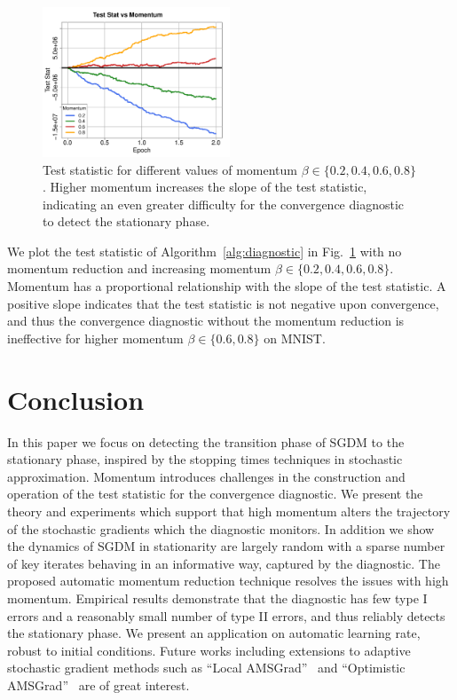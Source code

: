 \documentclass[conference]{IEEEtran}
\begin{document}
\begin{figure}[b]
\vspace{-0.2in}
\begin{center}
\includegraphics[width=2.2in]{fig/RFig8_IPMom.pdf}
\end{center}
\vspace{-0.15in}
  \caption{
  Test statistic for different values of momentum $\beta \in \{0.2, 0.4, 0.6, 0.8\}$. 
  Higher momentum increases the slope of the test statistic, indicating an even greater difficulty for the convergence diagnostic to detect the stationary phase.
  }
\label{fig:mnist_ablation2}\vspace{-0.1in}
\end{figure}


We plot the test statistic of Algorithm~\ref{alg:diagnostic} in Fig.~\ref{fig:mnist_ablation2} with no momentum reduction and increasing momentum $\beta \in \{0.2, 0.4, 0.6, 0.8\}$.
Momentum has a proportional relationship with the slope of the test statistic. 
A positive slope indicates that the test statistic is not negative upon convergence, and thus the convergence diagnostic without the momentum reduction is ineffective for higher momentum $\beta \in\{ 0.6, 0.8\}$ on MNIST.




\section{Conclusion}


In this paper we focus on detecting the transition phase of SGDM to the stationary phase, inspired by the stopping times techniques in stochastic approximation. 
Momentum introduces challenges in the construction and operation of the test statistic for the convergence diagnostic.
We present the theory and experiments which support that high momentum alters the trajectory of the stochastic gradients which the diagnostic monitors. 
In addition we show the dynamics of SGDM in stationarity are largely random with a sparse number of key iterates behaving in an informative way, captured by the diagnostic.
The proposed automatic momentum reduction technique resolves the issues with high momentum. 
Empirical results demonstrate that the diagnostic has few type I errors and a reasonably small number of type II errors, and thus reliably detects the stationary phase.
We present an application on automatic learning rate, robust to initial conditions.
Future works including extensions to adaptive stochastic gradient methods such as  ``Local AMSGrad''~\cite{Proc:Chen_FODS20} and
``Optimistic AMSGrad''~\cite{wang2020optimistic} are  of great interest.
\end{document}
